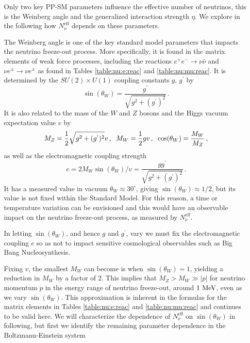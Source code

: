 Only two key PP-SM parameters  influence the effective number of neutrinos, this is the Weinberg angle and the generalized interaction strength $\eta$. We explore in the following how  $N_\nu^{\mathrm{eff}}$ depends on these parameters.

The Weinberg angle is one of the key standard model parameters that impacts the neutrino freeze-out process.  More specifically, it is found in the matrix elements of weak force processes, including the reactions $e^+e^-\rightarrow \nu\bar\nu$ and $\nu e^\pm\rightarrow \nu e^\pm$ as found in Tables \ref{table:nu:e:reac} and \ref{table:nu:mu:reac}.  It is determined by the $SU(2)\times U(1)$ coupling constants $g$, $g^{'}$  by
\begin{equation}
\sin(\theta_W)=\frac{g^{'}}{\sqrt{g^2+(g^{'})^2}}\,.
\end{equation}
It is also related to the mass of the $W$ and $Z$ bosons and the Higgs vacuum expectation value $v$ by
\begin{equation}
M_Z=\frac{1}{2}\sqrt{g^2+(g^{'})^2}v\,,\hspace{2mm}  M_W=\frac{1}{2}gv\,,\hspace{2mm} \cos(\theta_W)=\frac{M_W}{M_Z}\,,
\end{equation}
as well as the electromagnetic coupling strength
\begin{equation}
e=2M_W\sin(\theta_W)/v=\frac{gg^{'}}{\sqrt{g^2+(g^{'})^2}}\,.
\end{equation}
It has a measured value in vacuum $\theta_W\approx 30^\circ$, giving $\sin(\theta_W)\approx 1/2$, but its value is not fixed within the Standard Model. For this reason, a time or temperature variation can be envisioned and this would have an observable impact on the neutrino freeze-out process, as measured by $N_\nu^{\mathrm{eff}}$.

In letting $\sin(\theta_W)$, and hence $g$ and $g^{'}$, vary we must fix the electromagnetic coupling $e$ so as not to impact sensitive cosmological observables such as Big Bang Nucleosynthesis.  

Fixing $v$, the smallest $M_W$ can become is when $\sin(\theta_W)=1$, yielding a reduction in $M_W$ by a factor of $2$.  This implies that $M_Z>M_W\gg |p|$ for neutrino momentum $p$ in the energy range of neutrino freeze-out, around $1\text{ MeV}$, even as we vary $\sin(\theta_W)$.  This approximation is inherent in the formulas for the matrix elements  in Tables  \ref{table:nu:e:reac} and \ref{table:nu:mu:reac} and continues to be valid here. We will characterize the dependence of $N_\nu^{\mathrm{eff}}$ on $\sin(\theta_W)$ in following, but first we identify the remaining parameter dependence in the Boltzmann-Einstein system

